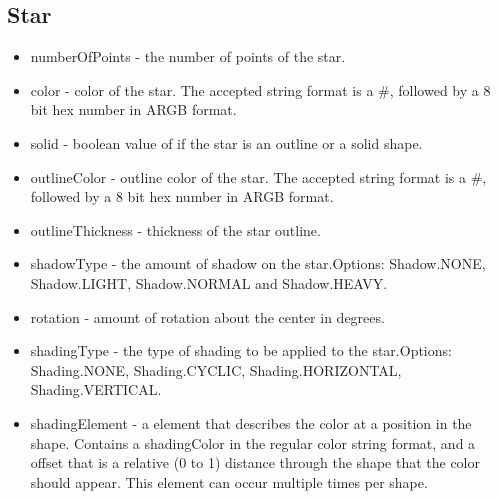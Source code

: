 \documentclass{article}
\begin{document}
\subsection{Star}
\begin{itemize}
\item numberOfPoints - the number of points of the star. 
\item color - color of the star. The accepted string format is a \#, followed by a 8 bit hex number in ARGB format.
\item solid - boolean value of if the star is an outline or a solid shape.
\item outlineColor - outline color of the star. The accepted string format is a \#, followed by a 8 bit hex number in ARGB format.
\item outlineThickness - thickness of the star outline.
\item shadowType - the amount of shadow on the star.\newline  Options: Shadow.NONE, Shadow.LIGHT, Shadow.NORMAL and Shadow.HEAVY.
\item rotation - amount of rotation about the center in degrees. 
\item shadingType - the type of shading to be applied to the star.\newline  Options: Shading.NONE, Shading.CYCLIC, Shading.HORIZONTAL, Shading.VERTICAL.
\item shadingElement - a element that describes the color at a position in the shape. Contains a shadingColor in the regular color string format, and a offset that is a relative (0 to 1) distance through the shape that the color should appear. This element can occur multiple times per shape.
\end{itemize}
\end{document}
